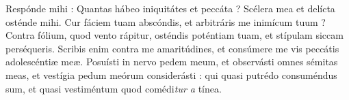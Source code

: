 \lettrine{R}{}espónde mihi :
Quantas hábeo iniquitátes et peccáta ? Scélera mea et delícta osténde mihi.
Cur fáciem tuam abscóndis, et arbitráris me inimícum tuum ?
Contra fólium, quod vento rápitur, osténdis poténtiam tuam, et stípulam siccam perséqueris.
Scribis enim contra me amaritúdines, et consúmere me vis peccátis adolescéntiæ meæ.
Posuísti in nervo pedem meum, et observásti omnes sémitas meas, et vestígia pedum meórum considerásti :
qui quasi putrédo consuméndus sum, et quasi vestiméntum quod comédi\textit{tur a} tínea.
